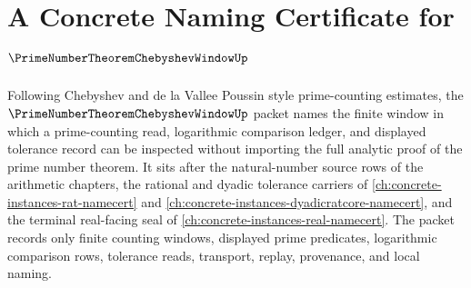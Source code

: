 \chapter{A Concrete Naming Certificate for $\PrimeNumberTheoremChebyshevWindowUp$}
\label{ch:concrete-instances-prime-number-theorem-chebyshev-window-namecert}

Following Chebyshev and de la Vallee Poussin style prime-counting estimates, the $\PrimeNumberTheoremChebyshevWindowUp$ packet names the finite window in which a prime-counting read, logarithmic comparison ledger, and displayed tolerance record can be inspected without importing the full analytic proof of the prime number theorem. It sits after the natural-number source rows of the arithmetic chapters, the rational and dyadic tolerance carriers of \autoref{ch:concrete-instances-rat-namecert} and \autoref{ch:concrete-instances-dyadicratcore-namecert}, and the terminal real-facing seal of \autoref{ch:concrete-instances-real-namecert}. The packet records only finite counting windows, displayed prime predicates, logarithmic comparison rows, tolerance reads, transport, replay, provenance, and local naming.

